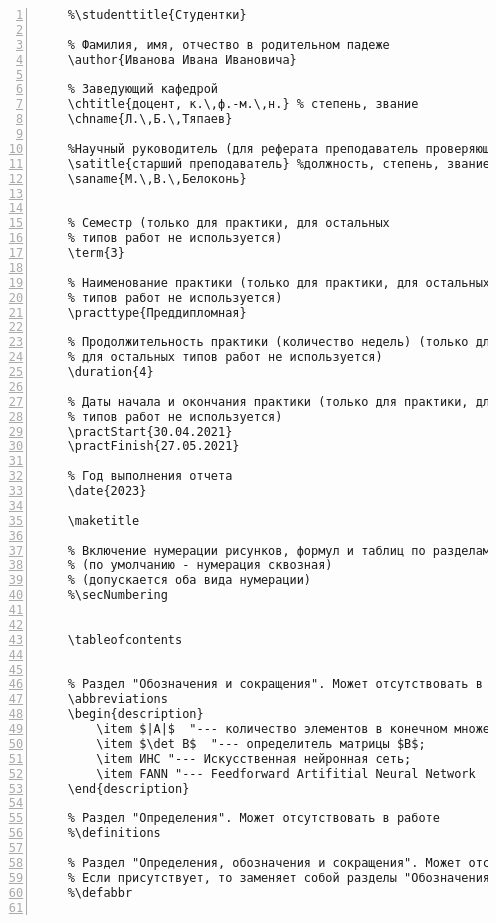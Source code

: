 \documentclass[bachelor, och, pract]{SCWorks}
\begin{document}
\begin{Verbatim}[fontsize=\small, numbers=left]
	% Для студентки. Для работы студента следующая команда не нужна.
	%\studenttitle{Студентки}
	
	% Фамилия, имя, отчество в родительном падеже
	\author{Иванова Ивана Ивановича}
	
	% Заведующий кафедрой
	\chtitle{доцент, к.\,ф.-м.\,н.} % степень, звание
	\chname{Л.\,Б.\,Тяпаев}
	
	%Научный руководитель (для реферата преподаватель проверяющий работу)
	\satitle{старший преподаватель} %должность, степень, звание
	\saname{М.\,В.\,Белоконь}
	
	
	% Семестр (только для практики, для остальных
	% типов работ не используется)
	\term{3}
	
	% Наименование практики (только для практики, для остальных
	% типов работ не используется)
	\practtype{Преддипломная}
	
	% Продолжительность практики (количество недель) (только для практики,
	% для остальных типов работ не используется)
	\duration{4}
	
	% Даты начала и окончания практики (только для практики, для остальных
	% типов работ не используется)
	\practStart{30.04.2021}
	\practFinish{27.05.2021}
	
	% Год выполнения отчета
	\date{2023}
	
	\maketitle
	
	% Включение нумерации рисунков, формул и таблиц по разделам
	% (по умолчанию - нумерация сквозная)
	% (допускается оба вида нумерации)
	%\secNumbering
	
	
	\tableofcontents
	
	
	% Раздел "Обозначения и сокращения". Может отсутствовать в работе
	\abbreviations
	\begin{description}
		\item $|A|$  "--- количество элементов в конечном множестве $A$;
		\item $\det B$  "--- определитель матрицы $B$;
		\item ИНС "--- Искусственная нейронная сеть;
		\item FANN "--- Feedforward Artifitial Neural Network
	\end{description}
	
	% Раздел "Определения". Может отсутствовать в работе
	%\definitions
	
	% Раздел "Определения, обозначения и сокращения". Может отсутствовать в работе.
	% Если присутствует, то заменяет собой разделы "Обозначения и сокращения" и "Определения"
	%\defabbr
	

\end{Verbatim}
\end{document}
